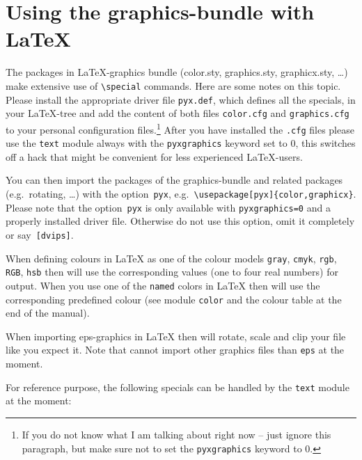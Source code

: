 \section{Using the graphics-bundle with \LaTeX}

The packages in \LaTeX-graphics bundle (color.sty, graphics.sty,
graphicx.sty, \ldots) make extensive use of \verb|\special| commands.
Here are some notes on this topic. Please install the appropriate
driver file \verb|pyx.def|, which defines all the specials, in your
\LaTeX-tree and add the content of both files \verb|color.cfg| and
\verb|graphics.cfg| to your personal configuration files.\footnote{If
you do not know what I am talking about right now -- just ignore this
paragraph, but make sure not to set the \texttt{pyxgraphics} keyword
to 0.} After you have installed the \verb|.cfg| files please use the
\verb|text| module always with the \verb|pyxgraphics| keyword set to
0, this switches off a hack that might be convenient for less
experienced \LaTeX-users.

You can then import the packages of the graphics-bundle and related
packages (e.g.~rotating, \ldots) with the option~\verb|pyx|,
e.g.~\verb|\usepackage[pyx]{color,graphicx}|. Please note that the
option~\verb|pyx| is only available with \verb|pyxgraphics=0| and a
properly installed driver file. Otherwise do not use this option, omit
it completely or say~\verb|[dvips]|.

When defining colours in \LaTeX{} as one of the colour models
\verb|gray|, \verb|cmyk|, \verb|rgb|, \verb|RGB|, \verb|hsb| then
\PyX{} will use the corresponding values (one to four real numbers)
for output. When you use one of the \verb|named| colors in \LaTeX{}
then \PyX{} will use the corresponding predefined colour (see module
\verb|color| and the colour table at the end of the manual).

When importing eps-graphics in \LaTeX{} then \PyX{} will rotate, scale
and clip your file like you expect it. Note that \PyX{} cannot import
other graphics files than \verb|eps| at the moment.

For reference purpose, the following specials can be handled by the
\verb|text| module at the moment:\medskip


